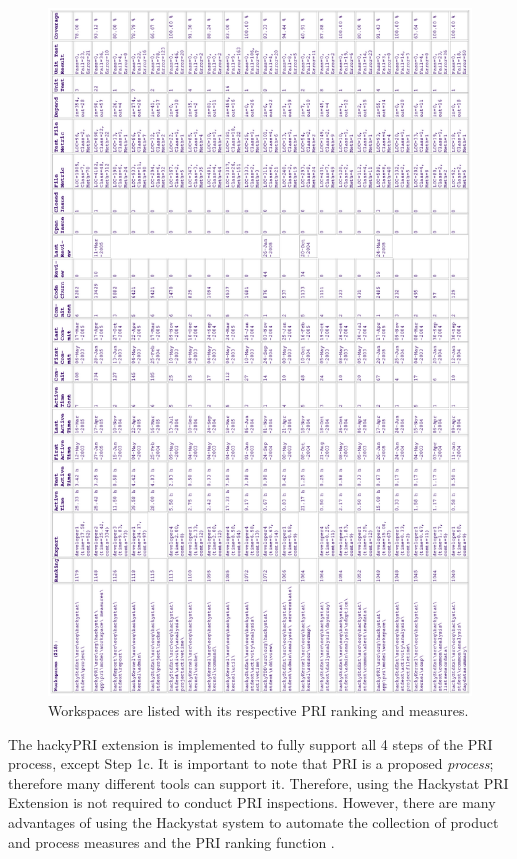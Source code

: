 \begin{figure}[htbp]
  \centering
  \includegraphics[height=1.00\textheight]{figs/2005-04-25-cropped-hidden.eps}
  \caption[The PRI Ranking analysis]{Workspaces are listed with its
  respective PRI ranking and measures.}
  \label{fig:intro-WorkspacePRIAnalysis}
\end{figure}

The hackyPRI extension is implemented to fully support all 4 steps of the
PRI process, except Step 1c. It is important to note that PRI is a proposed
\textit{process}; therefore many different tools can support it. Therefore,
using the Hackystat PRI Extension is not required to conduct PRI
inspections. However, there are many advantages of using the Hackystat
system to automate the collection of product and process measures and the
PRI ranking function \cite{Johnson05}.

